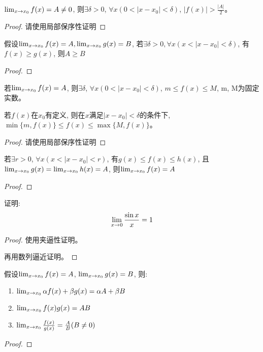 \begin{lemma}
    $\lim_{x \to x_0 } f(x) = A \neq 0$, 则$\exists \delta > 0$, $\forall x ( 0 < \left| x - x_0\right| < \delta)$, $\left| f(x) \right| > \frac{\left| A \right|}{2}$。
\end{lemma}
\begin{proof}
    请使用局部保序性证明
\end{proof}

\begin{lemma}
    假设$\lim_{x \to x_0 } f(x) = A, \lim_{x \to x_0 } g(x) = B$, 若$\exists \delta > 0, \forall x (x < \left| x - x_0\right| < \delta)$, 有$f(x) \ge g(x)$, 则$A \ge B$
\end{lemma}
\begin{proof}

\end{proof}


\begin{theorem}[函数极限的局部有界性]
    若$\lim_{x \to x_0 } f(x) = A$, 则$\exists \delta$, $\forall x(0 < \left| x - x_0 \right| < \delta)$, $m \le f(x) \le M$, m, M为固定实数。

    若$f(x)$在$x_0$有定义, 则在$x$满足$\left| x - x_0 \right| < \delta$的条件下, $\min\{m, f(x)\} \le f(x) \le \max\{M, f(x)\}$。
\end{theorem}
\begin{proof}
    请使用局部保序性证明
\end{proof}

\begin{theorem}[函数极限的夹逼性定理]
    若$\exists r > 0$, $\forall x(x < \left| x - x_0 \right| < r)$, 有$g(x) \le f(x) \le h(x)$, 且$\lim_{x \to x_0 } g(x) = \lim_{x \to x_0 } h(x) = A$, 则$\lim_{x \to x_0 } f(x) = A$
\end{theorem}
\begin{proof}
    
\end{proof}

\begin{proposition}
    证明: 
    \[ \lim_{x \to 0 } \frac{\sin x}{x} = 1 \]
\end{proposition}
\begin{proof}
    使用夹逼性证明。

    再用数列逼近证明。
\end{proof}

\begin{theorem}[函数极限四则运算]
    假设$\lim_{x \to x_0 } f(x) = A$, $\lim_{x \to x_0 } g(x) = B$, 则: 
    \begin{enumerate}
        \item $\lim_{x \to x_0 } \alpha f(x) + \beta g(x) = \alpha A + \beta B$
        \item $\lim_{x \to x_0 } f(x)g(x) = AB$
        \item $\lim_{x \to x_0 } \frac{f(x)}{g(x)} = \frac{A}{B}(B \neq 0)$
    \end{enumerate}
\end{theorem}
\begin{proof}
    
\end{proof}

